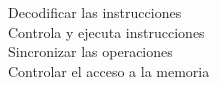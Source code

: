 \documentclass[preview]{standalone}
\begin{document}
Decodificar las instrucciones\\Controla y ejecuta instrucciones\\Sincronizar las operaciones\\Controlar el acceso a la memoria\\
\end{document}

